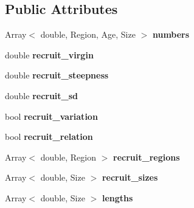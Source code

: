 \subsection*{Public Attributes}
\begin{DoxyCompactItemize}
\item 
\hypertarget{classIOSKJ_1_1Fish_a1bb94657937a5693877ffcda2aa05484}{Array$<$ double, Region, Age, Size $>$ {\bfseries numbers}}\label{classIOSKJ_1_1Fish_a1bb94657937a5693877ffcda2aa05484}

\item 
\hypertarget{classIOSKJ_1_1Fish_af0a09cc1b3700f57bb3d70b28fdb4c4b}{double {\bfseries recruit\-\_\-virgin}}\label{classIOSKJ_1_1Fish_af0a09cc1b3700f57bb3d70b28fdb4c4b}

\item 
\hypertarget{classIOSKJ_1_1Fish_ab5c57a9d4a4afc805a09c0cc097890f8}{double {\bfseries recruit\-\_\-steepness}}\label{classIOSKJ_1_1Fish_ab5c57a9d4a4afc805a09c0cc097890f8}

\item 
\hypertarget{classIOSKJ_1_1Fish_a346a8928285d63ac27b5c867055e0531}{double {\bfseries recruit\-\_\-sd}}\label{classIOSKJ_1_1Fish_a346a8928285d63ac27b5c867055e0531}

\item 
\hypertarget{classIOSKJ_1_1Fish_af8e1df8c242e01d1ddcca691411d5f06}{bool {\bfseries recruit\-\_\-variation}}\label{classIOSKJ_1_1Fish_af8e1df8c242e01d1ddcca691411d5f06}

\item 
\hypertarget{classIOSKJ_1_1Fish_a7d26b52bc1f462d1c6a212837f29ba2f}{bool {\bfseries recruit\-\_\-relation}}\label{classIOSKJ_1_1Fish_a7d26b52bc1f462d1c6a212837f29ba2f}

\item 
\hypertarget{classIOSKJ_1_1Fish_a9430ed413dcb90dd7ad71bda748104ff}{Array$<$ double, Region $>$ {\bfseries recruit\-\_\-regions}}\label{classIOSKJ_1_1Fish_a9430ed413dcb90dd7ad71bda748104ff}

\item 
\hypertarget{classIOSKJ_1_1Fish_a621bae527bed2badc921f5c48c14f91b}{Array$<$ double, Size $>$ {\bfseries recruit\-\_\-sizes}}\label{classIOSKJ_1_1Fish_a621bae527bed2badc921f5c48c14f91b}

\item 
\hypertarget{classIOSKJ_1_1Fish_ab2db2279759fd69d8be56797d04c21a7}{Array$<$ double, Size $>$ {\bfseries lengths}}\label{classIOSKJ_1_1Fish_ab2db2279759fd69d8be56797d04c21a7}


\end{DoxyCompactItemize}
